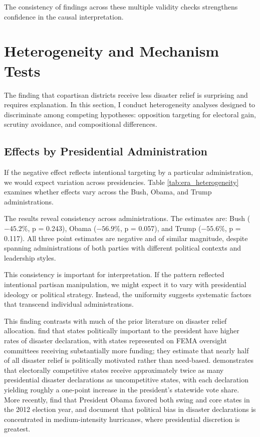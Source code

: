 \documentclass[12pt,letterpaper,oneside]{book}
\newcommand{\basepath}{g:/My Drive/Grad School}
\newcommand{\basepath}{basepath}
\begin{document}
The consistency of findings across these multiple validity checks strengthens confidence in the causal interpretation.

\section{Heterogeneity and Mechanism Tests}\label{sec:heterogeneity}

The finding that copartisan districts receive less disaster relief is surprising and requires explanation. In this section, I conduct heterogeneity analyses designed to discriminate among competing hypotheses: opposition targeting for electoral gain, scrutiny avoidance, and compositional differences.

\subsection{Effects by Presidential Administration}

If the negative effect reflects intentional targeting by a particular administration, we would expect variation across presidencies. Table \ref{tab:era_heterogeneity} examines whether effects vary across the Bush, Obama, and Trump administrations.



The results reveal consistency across administrations. The estimates are: Bush ($-45.2\%$, p = 0.243), Obama ($-56.9\%$, p = 0.057), and Trump ($-55.6\%$, p = 0.117). All three point estimates are negative and of similar magnitude, despite spanning administrations of both parties with different political contexts and leadership styles.

This consistency is important for interpretation. If the pattern reflected intentional partisan manipulation, we might expect it to vary with presidential ideology or political strategy. Instead, the uniformity suggests systematic factors that transcend individual administrations.

This finding contrasts with much of the prior literature on disaster relief allocation. \cite{garrett2003political} find that states politically important to the president have higher rates of disaster declaration, with states represented on FEMA oversight committees receiving substantially more funding; they estimate that nearly half of all disaster relief is politically motivated rather than need-based. \cite{reeves2011political} demonstrates that electorally competitive states receive approximately twice as many presidential disaster declarations as uncompetitive states, with each declaration yielding roughly a one-point increase in the president's statewide vote share. More recently, \cite{kriner2015disasters} find that President Obama favored both swing and core states in the 2012 election year, and \cite{schneider2022disastrous} document that political bias in disaster declarations is concentrated in medium-intensity hurricanes, where presidential discretion is greatest.
\end{document}
